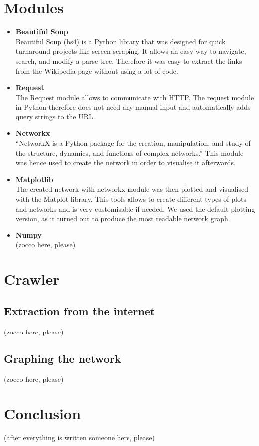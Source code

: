 \documentclass[10pt]{article}
\begin{document}
\section{Modules}

 \begin{itemize}    %
        \item\textbf{Beautiful Soup}\\
	Beautiful Soup (bs4) is a Python library that was designed for quick turnaround projects like screen-scraping. It allows an easy way to navigate, search, and modify a parse tree. 	
	\cite{cru} Therefore it was easy to extract the links from the Wikipedia page without using a lot of code. 
 
        \item \textbf{Request}\\
 	The Request module allows to communicate with HTTP. The request module in Python therefore does not need any manual input and automatically adds query strings to the URL.   
	\cite{req}
	
        \item \textbf{Networkx}\\
	``NetworkX is a Python package for the creation, manipulation, and study of the structure, dynamics, and functions of complex networks.'' \cite{net} This module was hence used to  	create the network in order to visualise it afterwards. 
	
        \item \textbf{Matplotlib}\\
        The created network with networkx module was then plotted and visualised with the Matplot library. This tools allows to create different types of plots and networks and is very
        customisable if needed. We used the default plotting version, as it turned out to produce the most readable network graph. 
        
        \item \textbf{Numpy}\\
        
        (zocco here, please)
        
        
    \end{itemize}
 

\section{Crawler}
	\subsection{Extraction from the internet}
	
	(zocco here, please)
	
	\subsection{Graphing the network}
	
	(zocco here, please)
	
\section{Conclusion}

(after everything is written someone here, please)



\newpage
 

\end{document}
